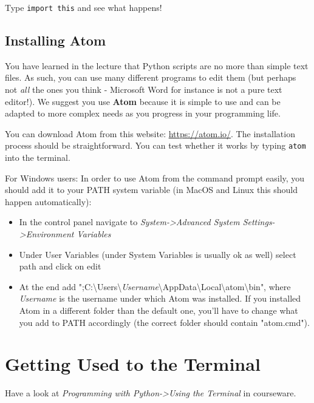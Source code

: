 \vspace{1em}

\noindent Type \texttt{import this} and see what happens!

\subsection{Installing Atom}

You have learned in the lecture that Python scripts are no more than simple text files. As such, you can use many different programs to edit them (but perhaps not \textit{all} the ones you think - Microsoft Word for instance is not a pure text editor!). We suggest you use \textbf{Atom} because it is simple to use and can be adapted to more complex needs as you progress in your programming life.

\vspace{1em}

\noindent You can download Atom from this website: \url{https://atom.io/}. The installation process should be straightforward. You can test whether it works by typing \texttt{atom} into the terminal.

\noindent For Windows users: In order to use Atom from the command prompt easily, you should add it to your PATH system variable (in MacOS and Linux this should happen automatically): 

\begin{itemize}
    \item In the control panel navigate to \textit{System->Advanced System Settings->Environment Variables}
    \item Under User Variables (under System Variables is usually ok as well) select path and click on edit
    \item At the end add ";C:\textbackslash Users\textbackslash\textit{Username}\textbackslash AppData\textbackslash Local\textbackslash atom\textbackslash bin", where \textit{Username} is the username under which Atom was installed. If you installed Atom in a different folder than the default one, you'll have to change what you add to PATH accordingly (the correct folder should contain "atom.cmd").

\end{itemize}

\section{Getting Used to the Terminal}

Have a look at \textit{Programming with Python->Using the Terminal} in courseware.

